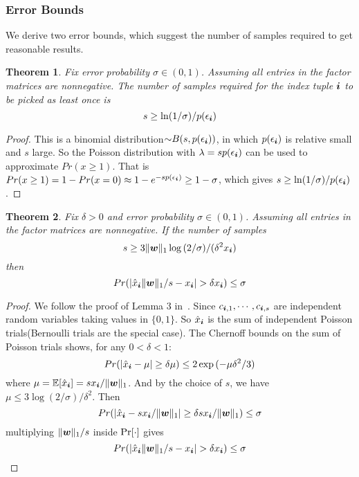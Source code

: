 \documentclass[10pt,journal,compsoc]{IEEEtran}
\newcommand{\V}[1]{{\boldsymbol{{\MakeLowercase{#1}}}}}
\newcommand{\predx}{\hat{x}_{\V{i}}}
\newcommand{\norm}[2]{\|#1\|_{#2}}
\newtheorem{theorem}{Theorem}
\begin{document}
\subsubsection{Error Bounds}
We derive two error bounds, which suggest the number of samples required to get reasonable results.
\begin{theorem}\label{theo:ObservationBound}
	Fix error probability $\sigma \in (0,1)$.
	Assuming all entries in the factor matrices are nonnegative.
	The number of samples required for the index tuple $\V{i}$ to be picked as least once is
	\[
	s \geq \ln(1/\sigma)/p(\epsilon_{\V{i}})
	\]
\end{theorem}
\begin{proof}
	This is a binomial distribution${\sim}B(s,p(\epsilon_{\V{i}}))$,
	in which $p(\epsilon_{\V{i}})$ is relative small and $s$ large.
	So the Poisson distribution with $\lambda = sp(\epsilon_{\V{i}})$
	can be used to approximate $Pr(x\geq1)$.
	That is $Pr(x\geq1) = 1-Pr(x=0)\approx 1-e^{-sp(\epsilon_{\V{i}})} \geq 1-\sigma$,
	which gives $s \geq \ln(1/\sigma)/p(\epsilon_{\V{i}})$.
\end{proof}

\begin{theorem}\label{theo:Bound}
	Fix $\delta > 0$ and error probability $\sigma \in (0,1)$.
	Assuming all entries in the factor matrices are nonnegative.
	If the number of samples
	\[
	s \geq 3\norm{\V{w}}{1}\log{(2/\sigma)}/(\delta^2 x_{\V{i}})
	\]
	then
	\[
	Pr(|\predx\norm{\V{W}}{1}/s - x_{\V{i}}| > \delta x_{\V{i}}) \leq \sigma
	\]
\end{theorem}

\begin{proof}
	We follow the proof of Lemma 3 in~\cite{BaPiKoSe15}.
	Since  $c_{\V{i},1},\cdots,c_{\V{i},s}$
	are independent random variables taking values in $\{0,1\}$.
	So $\predx$ is the sum of independent Poisson trials(Bernoulli trials are the special case).
	The Chernoff bounds on the sum of Poisson trials shows, for any $0 <\delta <1 $:
	\[
	Pr(|\predx - \mu|\geq\delta\mu) \leq 2\exp{(-\mu\delta^2/3)}
	\]
	where $\mu=\mathbb{E}[\predx]=sx_{\V{i}}/\norm{\V{W}}{1}$.
	And by the choice of $s$, we have
	$\mu\leq 3\log{(2/\sigma)/\delta^2}$.
	Then
	\[
	Pr(|\predx-sx_{\V{i}}/\norm{\V{W}}{1}|\geq\delta sx_{\V{i}}/\norm{\V{W}}{1}) \leq \sigma
	\]
	multiplying $\norm{\V{W}}{1}/s$ inside ${\rm Pr}[\cdot]$ gives
	\[
	Pr(|\predx\norm{\V{W}}{1}/s - x_{\V{i}}| > \delta x_{\V{i}}) \leq \sigma
	\]
\end{proof}
\end{document}
